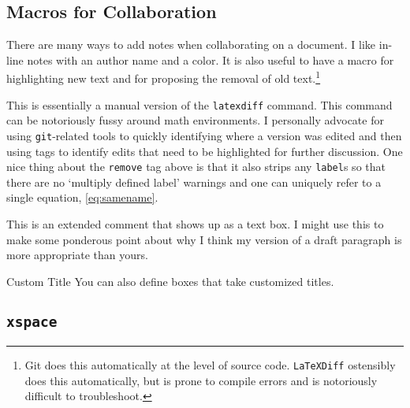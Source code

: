 \subsection{Macros for Collaboration}

There are many ways to add notes when collaborating on a document. I like in-line notes with an author name and a color.   It is also useful to have a macro for highlighting new text and for proposing the removal of old text.\footnote{Git does this automatically at the level of source code. \texttt{LaTeXDiff} ostensibly does this automatically, but is prone to compile errors and is notoriously difficult to troubleshoot.}



This is essentially a manual version of the \texttt{latexdiff} command. This command can be notoriously fussy around math environments. I personally advocate for using \texttt{git}-related tools to quickly identifying where a version was edited and then using tags to identify edits that need to be highlighted for further discussion. One nice thing about the \texttt{remove} tag above is that it also strips any \texttt{label}s so that there are no `multiply defined label' warnings and one can uniquely refer to a single equation, \eqref{eq:samename}.

\begin{flipcomment}
This is an extended comment that shows up as a text box. I might use this to make some ponderous point about why I think my version of a draft paragraph is more appropriate than yours.
\end{flipcomment}

\begin{boxedcomment}{Custom Title}
You can also define boxes that take customized titles. 
\end{boxedcomment}


\subsection{\texorpdfstring{\texttt{xspace}}{xspace}}

